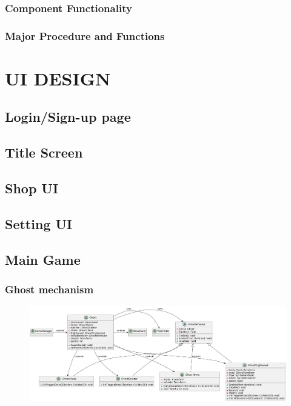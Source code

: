 \documentclass[11pt]{article}
\begin{document}
\subsubsection{Component Functionality}
\subsubsection{Major Procedure and Functions}



\section{UI DESIGN}

\subsection{Login/Sign-up page}

\subsection{Title Screen}

\subsection{Shop UI}

\subsection{Setting UI}

\subsection{Main Game}

\subsubsection{Ghost mechanism}

\begin{figure}[H]
    \centering
    \includegraphics*[scale=0.4]{Ghost_Class.png}
\end{figure}
\end{document}
